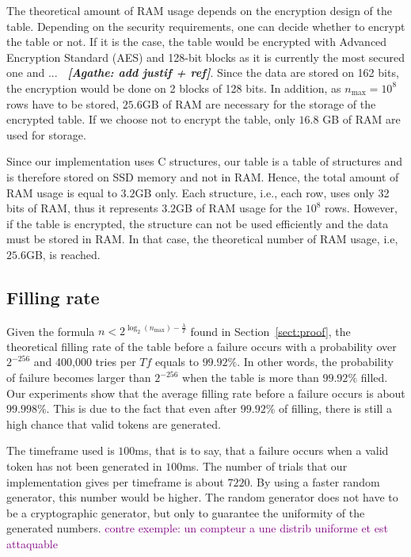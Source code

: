 \documentclass{llncs}
\newcounter{prob}
\newcommand{\ab}[1]{\emph{\bf \color{blue}~[Agathe: #1]}}
\begin{document}
The theoretical amount of RAM usage depends on the encryption design of the table. Depending on the security requirements, one can decide whether to encrypt the table or not. If it is the case, the table would be encrypted with Advanced Encryption Standard (AES) and 128-bit blocks as it is currently the most secured one and ... \ab{add justif + ref}. Since the data are stored on 162 bits, the encryption would be done on 2 blocks of 128 bits. In addition, as $n_{\max} = 10^8$ rows have to be stored, $25.6$GB of RAM are necessary for the storage of the encrypted table. If we choose not to encrypt the table, only $16.8$ GB of RAM are used for storage.

Since our implementation uses C structures, our table is a table of structures and is therefore stored on SSD memory and not in RAM. Hence, the total amount of RAM usage is equal to $3.2$GB only. Each structure, i.e., each row, uses only 32 bits of RAM, thus it represents $3.2$GB of RAM usage for the $10^8$ rows. However, if the table is encrypted, the structure can not be used efficiently and the data must be stored in RAM. In that case, the theoretical number of RAM usage, i.e, $25.6$GB, is reached.

\subsection{Filling rate}

Given the formula $n <2^{\log_2(n_{\max})-\frac{\lambda}{T}}$ found in Section~\ref{sect:proof}, the theoretical filling rate of the table before a failure occurs with a probability over $2^{-256}$ and 400,000 tries per $Tf$ equals to $99.92\%$. In other words, the probability of failure becomes larger than $2^{-256}$ when the table is more than $99.92\%$ filled. Our experiments show that the average filling rate before a failure occurs is about $99.998\%$. This is due to the fact that even after $99.92\%$ of filling, there is still a high chance that valid tokens are generated.

The timeframe used is $100$ms, that is to say, that a failure occurs when a valid token has not been generated in $100$ms. The number of trials that our implementation gives per timeframe is about $7220$. By using a faster random generator, this number would be higher. The random generator does not have to be a cryptographic generator, but only to guarantee the uniformity of the generated numbers. \textcolor{purple}{contre exemple: un compteur a une distrib uniforme et est attaquable}
\end{document}
